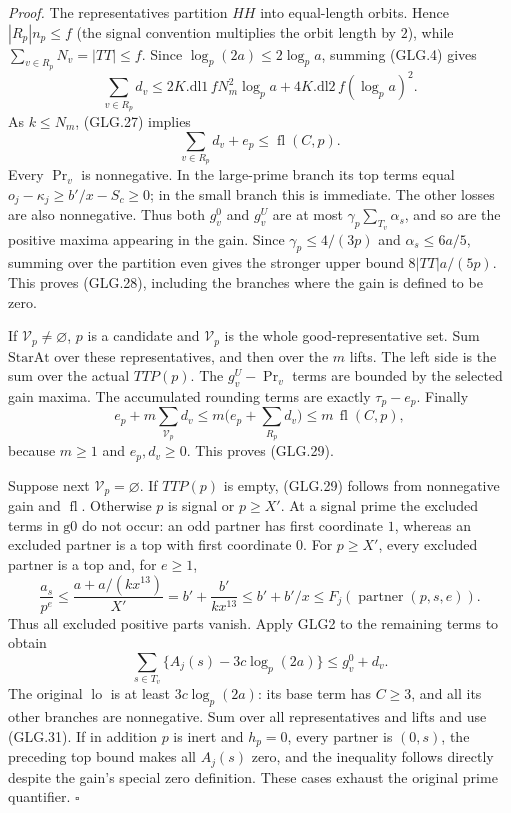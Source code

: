 \emph{Proof.}
The representatives partition \(HH\) into equal-length orbits.
Hence \(|R_p|n_p\le f\) (the signal convention multiplies
the orbit length by \(2\)), while \(\sum_{v\in R_p}N_v=|TT|\le f\).
Since \(\log_p(2a)\le2\log_pa\), summing (GLG.4) gives
\[
 \sum_{v\in R_p}d_v
 \le2K.\mathrm{dl1}\,fN_m^2\log_pa
                      +4K.\mathrm{dl2}\,f(\log_pa)^2 .
 \]
As \(k\le N_m\), (GLG.27) implies
\[
                     \sum_{v\in R_p}d_v+e_p
                                      \le\operatorname{fl}(C,p). \tag{GLG.31}
\]
Every \(\Pr_v\) is nonnegative. In the large-prime branch
its top terms equal \(o_j-\kappa_j\ge b'/x-S_c\ge0\);
in the small branch this is immediate. The other losses
are also nonnegative. Thus both \(g_v^0\) and \(g_v^U\)
are at most \(\gamma_p\sum_{T_v}\alpha_s\), and so are
the positive maxima appearing in the gain. Since
\(\gamma_p\le4/(3p)\) and \(\alpha_s\le6a/5\), summing
over the partition even gives the stronger upper bound
\(8|TT|a/(5p)\). This proves (GLG.28), including the
branches where the gain is defined to be zero.

If \(\mathcal V_p\ne\varnothing\), \(p\) is a candidate
and \(\mathcal V_p\) is the whole good-representative set.
Sum \(\mathrm{StarAt}\) over these representatives, and
then over the \(m\) lifts. The left side is the sum over
the actual \(TTP(p)\). The \(g_v^U-\Pr_v\) terms are
bounded by the selected gain maxima. The accumulated
rounding terms are exactly \(\tau_p-e_p\). Finally
\[
 e_p+m\sum_{\mathcal V_p}d_v
   \le m\bigl(e_p+\sum_{R_p}d_v\bigr)
   \le m\,\operatorname{fl}(C,p),
 \]
because \(m\ge1\) and \(e_p,d_v\ge0\). This proves (GLG.29).

Suppose next \(\mathcal V_p=\varnothing\). If \(TTP(p)\)
is empty, (GLG.29) follows from nonnegative gain and
\(\operatorname{fl}\). Otherwise \(p\) is signal or
\(p\ge X'\). At a signal prime the excluded terms in
\(\mathrm{g0}\) do not occur: an odd partner has first
coordinate \(1\), whereas an excluded partner is a top
with first coordinate \(0\). For \(p\ge X'\), every
excluded partner is a top and, for \(e\ge1\),
\[
 \frac{a_s}{p^e}
 \le\frac{a+a/(kx^{13})}{X'}
       =b'+\frac{b'}{kx^{13}}
       \le b'+b'/x\le F_j(\operatorname{partner}(p,s,e)).
 \]
Thus all excluded positive parts vanish. Apply GLG2 to
the remaining terms to obtain
\[
 \sum_{s\in T_v}\{A_j(s)-3c\log_p(2a)\}
                                      \le g_v^0+d_v .
 \]
The original \(\operatorname{lo}\) is at least
\(3c\log_p(2a)\): its base term has \(C\ge3\), and all
its other branches are nonnegative. Sum over all
representatives and lifts and use (GLG.31).
If in addition \(p\) is inert and \(h_p=0\), every partner
is \((0,s)\), the preceding top bound makes all \(A_j(s)\)
zero, and the inequality follows directly despite the
gain's special zero definition. These cases exhaust the
original prime quantifier.
\hfill\(\square\)

